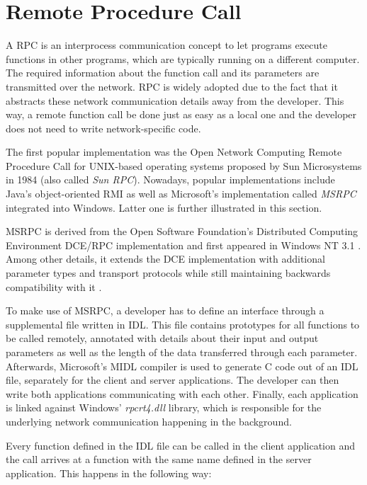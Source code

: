 \section{Remote Procedure Call}
\label{sec:rpc}
A \gls{RPC} is an interprocess communication concept to let programs execute functions in other programs, which are typically running on a different computer.
The required information about the function call and its parameters are transmitted over the network.
\gls{RPC} is widely adopted due to the fact that it abstracts these network communication details away from the developer.
This way, a remote function call be done just as easy as a local one and the developer does not need to write network-specific code.

The first popular implementation was the Open Network Computing Remote Procedure Call for UNIX-based operating systems proposed by Sun Microsystems in 1984 \cite{callaway2010sunrpc} (also called \emph{Sun RPC}).
Nowadays, popular implementations include Java's object-oriented \gls{RMI} as well as Microsoft's implementation called \emph{MSRPC} integrated into Windows.
Latter one is further illustrated in this section.

MSRPC is derived from the Open Software Foundation's Distributed Computing Environment DCE/\gls{RPC} implementation and first appeared in Windows NT 3.1 \cite{black1993msrpc}.
Among other details, it extends the DCE implementation with additional parameter types and transport protocols while still maintaining backwards compatibility with it \cite{microsoft2015msrpce}.

To make use of MSRPC, a developer has to define an interface through a supplemental file written in \gls{IDL}.
This file contains prototypes for all functions to be called remotely, annotated with details about their input and output parameters as well as the length of the data transferred through each parameter.
Afterwards, Microsoft's MIDL compiler is used to generate C code out of an \gls{IDL} file, separately for the client and server applications.
The developer can then write both applications communicating with each other.
Finally, each application is linked against Windows' \emph{rpcrt4.dll} library, which is responsible for the underlying network communication happening in the background.

Every function defined in the \gls{IDL} file can be called in the client application and the call arrives at a function with the same name defined in the server application.
This happens in the following way:

